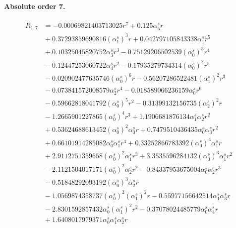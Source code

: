 \documentclass[10pt]{article}
\begin{document}
\paragraph{Absolute order 7.}
\begin{align*}
R_{1,7} &=  - 0.00069821403713025 r^{7} + 0.125 \alpha_{5}^s r \\
&{}  + 0.37293859690816 \left(\alpha_{1}^s\right)^{3} r + 0.042797105843338 \alpha_{1}^s r^{5} \\
&{}  + 0.10325045820752 \alpha_{3}^s r^{3} - 0.75129206502539 \left(\alpha_{0}^s\right)^{3} r^{4} \\
&{}  - 0.12447253060722 \alpha_{4}^s r^{2} - 0.17935279734314 \left(\alpha_{0}^s\right)^{2} r^{5} \\
&{}  - 0.020902477635746 \left(\alpha_{0}^s\right)^{6} r - 0.56207286522481 \left(\alpha_{1}^s\right)^{2} r^{3} \\
&{}  - 0.073841572008579 \alpha_{2}^s r^{4} - 0.018589066236159 \alpha_{0}^s r^{6} \\
&{}  - 0.59662818041792 \left(\alpha_{0}^s\right)^{5} r^{2} - 0.31399132156735 \left(\alpha_{2}^s\right)^{2} r \\
&{}  - 1.2665901227865 \left(\alpha_{0}^s\right)^{4} r^{3} + 1.1906681876134 \alpha_{1}^s \alpha_{2}^s r^{2} \\
&{}  + 0.53624688613452 \left(\alpha_{0}^s\right)^{2} \alpha_{3}^s r + 0.7479510436435 \alpha_{0}^s \alpha_{3}^s r^{2} \\
&{}  + 0.66101914285082 \alpha_{0}^s \alpha_{1}^s r^{4} + 0.33252866783392 \left(\alpha_{0}^s\right)^{4} \alpha_{1}^s r \\
&{}  + 2.9112751359658 \left(\alpha_{0}^s\right)^{2} \alpha_{1}^s r^{3} + 3.3535596284132 \left(\alpha_{0}^s\right)^{3} \alpha_{1}^s r^{2} \\
&{}  - 2.1121504017171 \left(\alpha_{0}^s\right)^{2} \alpha_{2}^s r^{2} - 0.84337953675004 \alpha_{0}^s \alpha_{2}^s r^{3} \\
&{}  - 0.51848292093192 \left(\alpha_{0}^s\right)^{3} \alpha_{2}^s r \\
&{}  - 1.0569874358737 \left(\alpha_{0}^s\right)^{2} \left(\alpha_{1}^s\right)^{2} r - 0.55977156642514 \alpha_{1}^s \alpha_{3}^s r \\
&{}  - 2.8301592857432 \alpha_{0}^s \left(\alpha_{1}^s\right)^{2} r^{2} - 0.37078024485779 \alpha_{0}^s \alpha_{4}^s r \\
&{}  + 1.6408017979371 \alpha_{0}^s \alpha_{1}^s \alpha_{2}^s r
\end{align*}
\end{document}
